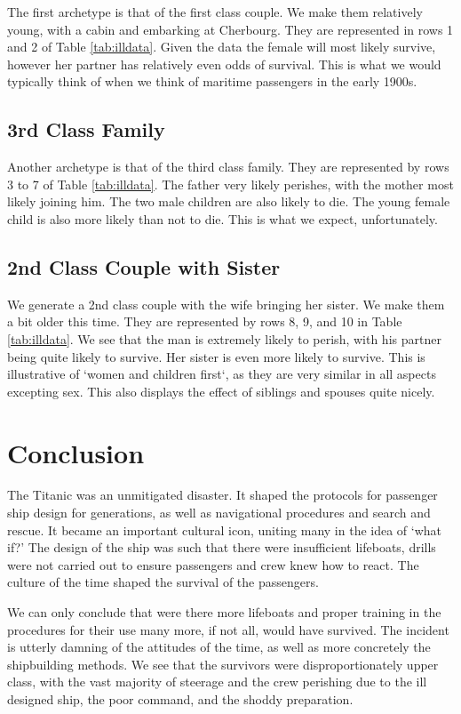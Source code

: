 \documentclass[9pt]{extarticle}
\begin{document}
The first archetype is that of the first class couple. We make them relatively young, with a cabin and embarking at Cherbourg. They are represented in rows 1 and 2 of Table \ref{tab:illdata}. Given the data the female will most likely survive, however her partner has relatively even odds of survival. This is what we would typically think of when we think of maritime passengers in the early 1900s.

\subsection{3rd Class Family}

Another archetype is that of the third class family. They are represented by rows 3 to 7 of Table \ref{tab:illdata}. The father very likely perishes, with the mother most likely joining him. The two male children are also likely to die. The young female child is also more likely than not to die. This is what we expect, unfortunately.

\subsection{2nd Class Couple with Sister}

We generate a 2nd class couple with the wife bringing her sister. We make them a bit older this time. They are represented by rows 8, 9, and 10 in Table \ref{tab:illdata}. We see that the man is extremely likely to perish, with his partner being quite likely to survive. Her sister is even more likely to survive. This is illustrative of `women and children first`, as they are very similar in all aspects excepting sex. This also displays the effect of siblings and spouses quite nicely.

\section{Conclusion}

The Titanic was an unmitigated disaster. It shaped the protocols for passenger ship design for generations, as well as navigational procedures and search and rescue. It became an important cultural icon, uniting many in the idea of `what if?' The design of the ship was such that there were insufficient lifeboats, drills were not carried out to ensure passengers and crew knew how to react. The culture of the time shaped the survival of the passengers. 

We can only conclude that were there more lifeboats and proper training in the procedures for their use many more, if not all, would have survived. The incident is utterly damning of the attitudes of the time, as well as more concretely the shipbuilding methods. We see that the survivors were disproportionately upper class, with the vast majority of steerage and the crew perishing due to the ill designed ship, the poor command, and the shoddy preparation.
\end{document}
